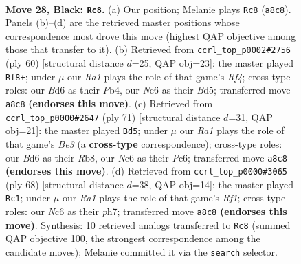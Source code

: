 \documentclass[11pt]{article}
\begin{document}
\clearpage

\begin{figure}[p]\centering
\begin{subfigure}{0.46\textwidth}\centering
\resizebox{\linewidth}{!}{%
\newchessgame
\chessboard[
  setfen={r3k3/p6R/2nb2p1/6P1/8/3b4/3B4/4K1N1 b q - 2 28},
  showmover=false,
  pgfstyle=straightmove, color=movearrow, markmove={a8-c8}
]}
\caption{}
\end{subfigure}\hfill
\begin{subfigure}{0.46\textwidth}\centering
\resizebox{\linewidth}{!}{%
\newchessgame
\chessboard[
  setfen={7k/p7/6pp/3B4/1P1bPR2/8/P6r/5K2 w - - 0 31},
  showmover=false,
  pgfstyle=straightmove, color=movearrow, markmove={f4-f8}
]}
\caption{}
\end{subfigure}
\\[4pt]
\begin{subfigure}{0.46\textwidth}\centering
\resizebox{\linewidth}{!}{%
\newchessgame
\chessboard[
  setfen={1r4k1/R6p/2p1b3/2B1Pp2/5P2/8/7P/6K1 b - - 2 36},
  showmover=false,
  pgfstyle=straightmove, color=movearrow, markmove={e6-d5}
]}
\caption{}
\end{subfigure}\hfill
\begin{subfigure}{0.46\textwidth}\centering
\resizebox{\linewidth}{!}{%
\newchessgame
\chessboard[
  setfen={5k2/7p/3p4/8/2B2P2/2b2K2/3r3P/5R2 w - - 0 35},
  showmover=false,
  pgfstyle=straightmove, color=movearrow, markmove={f1-c1}
]}
\caption{}
\end{subfigure}
\caption{\textbf{Move 28, Black: \texttt{Rc8}.} (a) Our position; Melanie plays \texttt{Rc8} (\texttt{a8c8}). Panels (b)--(d) are the retrieved master positions whose correspondence most drove this move (highest QAP objective among those that transfer to it). (b) Retrieved from \texttt{ccrl\_top\_p0002\#2756} (ply 60) [structural distance $d$=25, QAP obj=23]: the master played \texttt{Rf8+}; under $\mu$ our \emph{Ra1} plays the role of that game's \emph{Rf4}; cross-type roles: our \emph{B}d6 as their \emph{P}b4, our \emph{N}c6 as their \emph{B}d5; transferred move \texttt{a8c8} \textbf{(endorses this move)}. (c) Retrieved from \texttt{ccrl\_top\_p0000\#2647} (ply 71) [structural distance $d$=31, QAP obj=21]: the master played \texttt{Bd5}; under $\mu$ our \emph{Ra1} plays the role of that game's \emph{Be3} (a \textbf{cross-type} correspondence); cross-type roles: our \emph{B}d6 as their \emph{R}b8, our \emph{N}c6 as their \emph{P}c6; transferred move \texttt{a8c8} \textbf{(endorses this move)}. (d) Retrieved from \texttt{ccrl\_top\_p0000\#3065} (ply 68) [structural distance $d$=38, QAP obj=14]: the master played \texttt{Rc1}; under $\mu$ our \emph{Ra1} plays the role of that game's \emph{Rf1}; cross-type roles: our \emph{N}c6 as their \emph{p}h7; transferred move \texttt{a8c8} \textbf{(endorses this move)}. Synthesis: 10 retrieved analogs transferred to \texttt{Rc8} (summed QAP objective 100, the strongest correspondence among the candidate moves); Melanie committed it via the \texttt{search} selector.}
\label{fig:thought-m55}
\end{figure}
\end{document}
